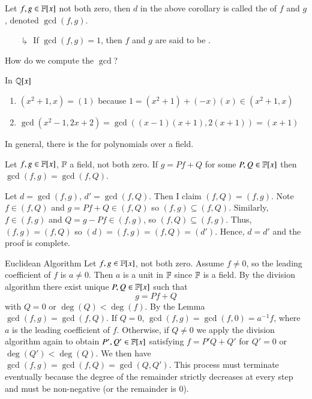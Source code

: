 \documentclass[12pt, a4paper, twoside, openright, titlepage]{book}
\begin{document}
\begin{defn}{}{}
    Let $f,g \in \mathbb F[x]$ not both zero, then $d$ in the above corollary is called the  of $f$ and $g$, denoted $\gcd(f,g)$.
    \begin{enumerate}
        \item[$\drsh$] If $\gcd(f,g) = 1$, then $f$ and $g$ are said to be . 
    \end{enumerate}
\end{defn}


\begin{qest}
    How do we compute the $\gcd$?
\end{qest}

\begin{eg}{}{}
    In $\mathbb Q[x]$
    \begin{enumerate}
        \item $(x^2+1,x) = (1)$ because $1 = (x^2+1) + (-x)(x) \in (x^2+1,x)$
        \item $\gcd(x^2-1,2x+2) = \gcd((x-1)(x+1),2(x+1)) = (x+1)$
    \end{enumerate}
\end{eg}


\begin{rmk}{}{}
    In general, there is the  for polynomials over a field.
\end{rmk}

\begin{lem}{}{}
    Let $f,g \in \mathbb F[x]$, $\mathbb F$ a field, not both zero. If $g = Pf + Q$ for some $P,Q \in \mathbb F[x]$ then $\gcd(f,g) = \gcd(f,Q)$.
\end{lem}
\begin{proof*}{}{}
    Let $d = \gcd(f,g)$, $d' = \gcd(f,Q)$. Then I claim $(f,Q) = (f,g)$. Note $f \in (f,Q)$ and $g = Pf + Q \in (f,Q)$ so $(f,g) \subseteq (f,Q)$. Similarly, $f \in (f,g)$ and $Q = g - Pf \in (f,g)$, so $(f,Q) \subseteq (f,g)$. Thus, $(f,g) = (f,Q)$ so $(d) = (f,g) = (f,Q) = (d')$. Hence, $d = d'$ and the proof is complete.
\end{proof*}

\begin{namthm}{Euclidean Algorithm}{}
    Let $f,g \in \mathbb F[x]$, not both zero. Assume $f \neq 0$, so the leading coefficient of $f$ is $a \neq 0$. Then $a$ is a unit in $\mathbb F$ since $\mathbb F$ is a field. By the division algorithm there exist unique $P, Q \in \mathbb F[x]$ such that \begin{equation}
        g = Pf + Q
    \end{equation}
    with $Q = 0$ or $\deg(Q) < \deg(f)$. By the Lemma $\gcd(f,g) = \gcd(f,Q)$. If $Q = 0$, $\gcd(f,g) = \gcd(f,0) = a^{-1}f$, where $a$ is the leading coefficient of $f$. Otherwise, if $Q \neq 0$ we apply the division algorithm again to obtain $P',Q' \in \mathbb F[x]$ satisfying $f = P'Q + Q'$ for $Q' = 0$ or $\deg(Q') < \deg(Q)$. We then have $\gcd(f,g) = \gcd(f,Q) = \gcd(Q, Q')$. This process must terminate eventually because the degree of the remainder strictly decreases at every step and must be non-negative (or the remainder is $0$).
\end{namthm}
\end{document}
